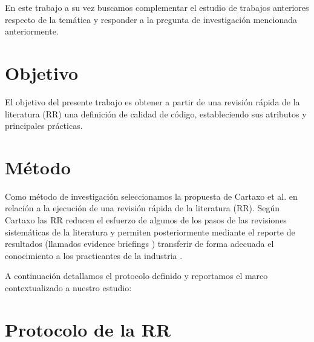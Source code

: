 \documentclass[conference]{IEEEtran}
\begin{document}
 En este trabajo a su vez buscamos complementar el estudio de trabajos anteriores respecto de la temática \cite{adorjan2020code} y responder a la pregunta de investigación mencionada anteriormente.
 \section{Objetivo}
 El objetivo del presente trabajo es obtener a partir de una revisión rápida de la literatura (RR) \cite{cartaxo2019software}\cite{cartaxo2020rapid}  una definición de calidad de código, estableciendo sus atributos y principales prácticas.


\section{Método}

Como método de investigación seleccionamos la propuesta de Cartaxo et al. \cite{cartaxo2020rapid} en relación a la ejecución de una revisión rápida de la literatura (RR). Según Cartaxo  las RR reducen el esfuerzo de algunos de los pasos de las revisiones sistemáticas de la literatura \cite{cartaxo2020rapid} y permiten posteriormente  mediante el reporte de  resultados (llamados evidence briefings  \cite{cartaxo2016evidence})  transferir de forma adecuada el conocimiento a los practicantes de la industria \cite{cartaxo2018role}. 

A continuación detallamos el protocolo definido y reportamos el marco contextualizado a nuestro estudio: 

\section{Protocolo de la RR}



\end{document}
